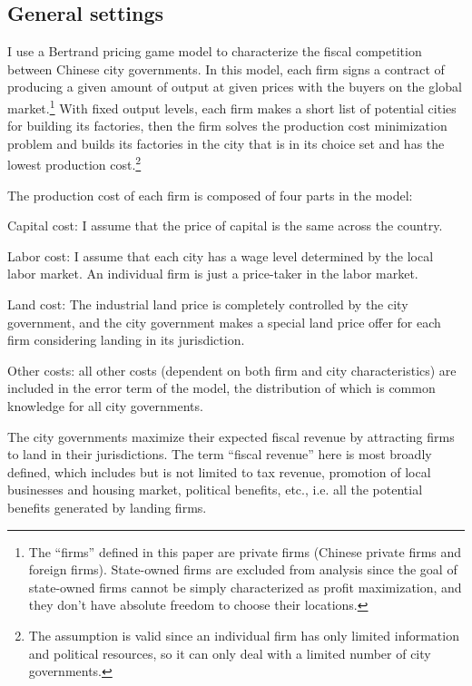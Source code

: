 \subsection{General settings}
I use a Bertrand pricing game model to characterize the fiscal competition between
Chinese city governments. In this model, each firm
signs a contract of producing
a given amount of output at given prices with the buyers on the global market.\footnote{
    The ``firms'' defined in this paper
    are private firms (Chinese private firms and foreign firms). State-owned firms are excluded
    from analysis since the goal of state-owned firms cannot be simply characterized
    as profit maximization,
    and they don't have absolute freedom to choose their locations.}
With fixed output levels, each firm makes a short list of potential cities for building
its factories,
then the firm solves the production cost minimization problem and builds its
factories in the city that is in its choice set and has the lowest production cost.\footnote{
    The assumption is valid since an individual firm has only limited information
    and political resources, so it can only deal with a limited number of city governments.}

The production cost of each firm is composed of four parts in the model:
\bnt
\item Capital cost: I assume that the price of capital is the same across the country.
\item Labor cost: I assume that
each city has a wage level determined by the local labor market.
An individual firm is just a price-taker in the labor market.
\item Land cost: The industrial land price is completely controlled by the city government,
and the city government makes a special land price offer for
each firm considering landing in its jurisdiction.
\item Other costs: all other costs (dependent on both firm and city characteristics)
are included in the error term of the model,
the distribution of which is common knowledge for all city governments.
\ent

The city governments maximize their expected fiscal revenue by
attracting firms to land in their jurisdictions. The term
``fiscal revenue'' here is most broadly defined, which includes
but is not limited to tax revenue,
promotion of local businesses and housing market, political benefits, etc., i.e.
all the potential benefits generated by landing firms.


